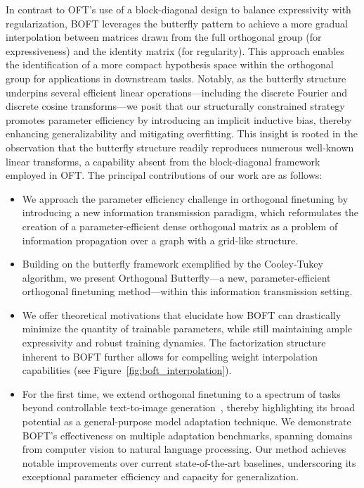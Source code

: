In contrast to OFT’s use of a block-diagonal design to balance expressivity with regularization, BOFT leverages the butterfly pattern to achieve a more gradual interpolation between matrices drawn from the full orthogonal group (for expressiveness) and the identity matrix (for regularity). This approach enables the identification of a more compact hypothesis space within the orthogonal group for applications in downstream tasks. Notably, as the butterfly structure underpins several efficient linear operations—including the discrete Fourier and discrete cosine transforms—we posit that our structurally constrained strategy promotes parameter efficiency by introducing an implicit inductive bias, thereby enhancing generalizability and mitigating overfitting. This insight is rooted in the observation that the butterfly structure readily reproduces numerous well-known linear transforms, a capability absent from the block-diagonal framework employed in OFT. The principal contributions of our work are as follows:

\begin{itemize}[leftmargin=*,nosep]
    \item We approach the parameter efficiency challenge in orthogonal finetuning by introducing a new information transmission paradigm, which reformulates the creation of a parameter-efficient dense orthogonal matrix as a problem of information propagation over a graph with a grid-like structure.
    \item Building on the butterfly framework exemplified by the Cooley-Tukey algorithm, we present Orthogonal Butterfly—a new, parameter-efficient orthogonal finetuning method—within this information transmission setting.
    \item We offer theoretical motivations that elucidate how BOFT can drastically minimize the quantity of trainable parameters, while still maintaining ample expressivity and robust training dynamics. The factorization structure inherent to BOFT further allows for compelling weight interpolation capabilities (see Figure~\ref{fig:boft_interpolation}).
    \item For the first time, we extend orthogonal finetuning to a spectrum of tasks beyond controllable text-to-image generation~\cite{qiu2023controlling}, thereby highlighting its broad potential as a general-purpose model adaptation technique. We demonstrate BOFT's effectiveness on multiple adaptation benchmarks, spanning domains from computer vision to natural language processing. Our method achieves notable improvements over current state-of-the-art baselines, underscoring its exceptional parameter efficiency and capacity for generalization.
\end{itemize}

